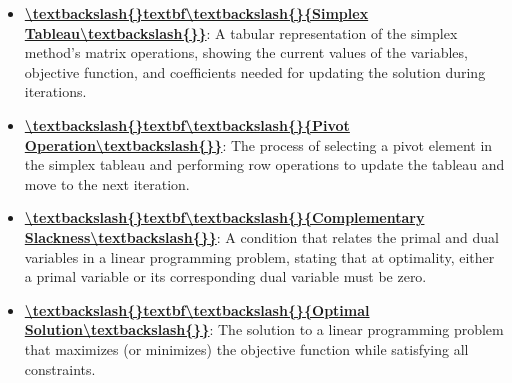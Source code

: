 \documentclass{article}%
\begin{document}
\begin{itemize}[leftmargin=*]
\item \href{https://www.math.purdue.edu/~yipn/421/2024-09-24-SimplexMatrix.pdf#page=10}{\textbf{\textbackslash{}textbackslash\{\}textbf\textbackslash{}textbackslash\{\}\{Simplex Tableau\textbackslash{}textbackslash\{\}\}}}: A tabular representation of the simplex method's matrix operations, showing the current values of the variables, objective function, and coefficients needed for updating the solution during iterations.%
\item \href{https://www.math.purdue.edu/~yipn/421/2024-09-24-SimplexMatrix.pdf#page=17}{\textbf{\textbackslash{}textbackslash\{\}textbf\textbackslash{}textbackslash\{\}\{Pivot Operation\textbackslash{}textbackslash\{\}\}}}: The process of selecting a pivot element in the simplex tableau and performing row operations to update the tableau and move to the next iteration.%
\item \href{https://www.math.purdue.edu/~yipn/421/2024-09-24-SimplexMatrix.pdf#page=14}{\textbf{\textbackslash{}textbackslash\{\}textbf\textbackslash{}textbackslash\{\}\{Complementary Slackness\textbackslash{}textbackslash\{\}\}}}: A condition that relates the primal and dual variables in a linear programming problem, stating that at optimality, either a primal variable or its corresponding dual variable must be zero.%
\item \href{https://www.math.purdue.edu/~yipn/421/2024-09-24-SimplexMatrix.pdf#page=16}{\textbf{\textbackslash{}textbackslash\{\}textbf\textbackslash{}textbackslash\{\}\{Optimal Solution\textbackslash{}textbackslash\{\}\}}}: The solution to a linear programming problem that maximizes (or minimizes) the objective function while satisfying all constraints.%
\end{itemize}%
\end{document}
